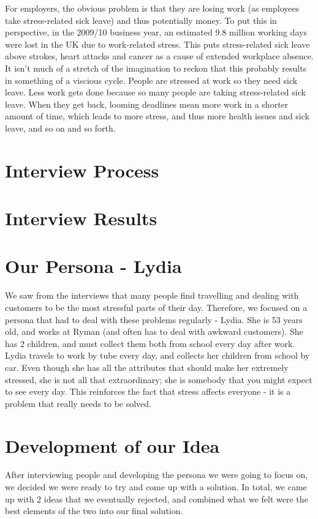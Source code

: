 \documentclass{scrartcl}
\begin{document}
For employers, the obvious problem is that they are losing work (as employees take stress-related sick leave) and thus
potentially money. To put this in perspective, in the 2009/10 business year, an estimated 9.8 million working days
were lost in the UK due to work-related stress. This puts stress-related sick leave above strokes, heart attacks and
cancer as a cause of extended workplace absence. It isn't much of a stretch of the imagination to reckon that this
probably results in something of a viscious cycle. People are stressed at work so they need sick leave. Less work gets
done because so many people are taking stress-related sick leave. When they get back, looming deadlines mean more work
in a shorter amount of time, which leads to more stress, and thus more health issues and sick leave, and so on and so forth.

\section{Interview Process}

\section{Interview Results}

\section{Our Persona - Lydia}
We saw from the interviews that many people find travelling and dealing with customers to be the most stressful parts of their day.
Therefore, we focused on a persona that had to deal with these problems regularly - Lydia. She is 53 years old, and works at Ryman
(and often has to deal with awkward customers). She has 2 children, and must collect them both from school every day after work.
Lydia travels to work by tube every day, and collects her children from school by car. Even though she has all the attributes that
should make her extremely stressed, she is not all that extraordinary; she is somebody that you might expect to see every day. This
reinforces the fact that stress affects everyone - it is a problem that really needs to be solved.

\section{Development of our Idea}
After interviewing people and developing the persona we were going to focus on, we decided we were ready to try and come up with
a solution. In total, we came up with 2 ideas that we eventually rejected, and combined what we felt were the best elements
of the two into our final solution.
\end{document}
